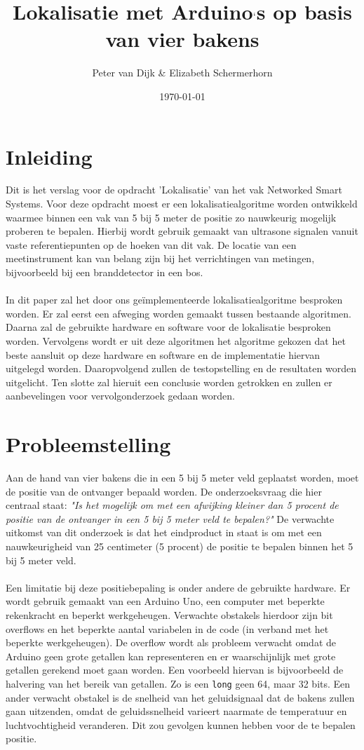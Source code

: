 \documentclass{article}
\author{Peter van Dijk \& Elizabeth Schermerhorn}
\date{\today}
\title{Lokalisatie met Arduino$`$s op basis van vier bakens}
\begin{document}
\maketitle
\newpage
\tableofcontents
\clearpage
\section{Inleiding}
Dit is het verslag voor de opdracht 'Lokalisatie' van het vak Networked Smart Systems. Voor deze opdracht moest er een lokalisatiealgoritme worden ontwikkeld waarmee binnen een vak van 5 bij 5 meter de positie zo nauwkeurig mogelijk proberen te bepalen. Hierbij wordt gebruik gemaakt van ultrasone signalen vanuit vaste referentiepunten op de hoeken van dit vak. De locatie van een meetinstrument kan van belang zijn bij het verrichtingen van metingen, bijvoorbeeld bij een branddetector in een bos. \\
\\
In dit paper zal het door ons ge\"{i}mplementeerde lokalisatiealgoritme besproken worden. Er zal eerst een afweging worden gemaakt tussen bestaande algoritmen. Daarna zal de gebruikte hardware en software voor de lokalisatie besproken worden. Vervolgens wordt er uit deze algoritmen het algoritme gekozen dat het beste aansluit op deze hardware en software en de implementatie hiervan uitgelegd worden. Daaropvolgend zullen de testopstelling en de resultaten worden uitgelicht. Ten slotte zal hieruit een conclusie worden getrokken en zullen er aanbevelingen voor vervolgonderzoek gedaan worden.


\section{Probleemstelling}
Aan de hand van vier bakens die in een 5 bij 5 meter veld geplaatst worden, moet de positie van de ontvanger bepaald worden. De onderzoeksvraag die hier centraal staat: \textit{"Is het mogelijk om met een afwijking kleiner dan 5 procent de positie van de ontvanger in een 5 bij 5 meter veld te bepalen?"}
De verwachte uitkomst van dit onderzoek is dat het eindproduct in staat is om met een nauwkeurigheid van 25 centimeter (5 procent) de positie te bepalen binnen het 5 bij 5 meter veld. \\
\\
Een limitatie bij deze positiebepaling is onder andere de gebruikte hardware. Er wordt gebruik gemaakt van een Arduino Uno, een computer met beperkte rekenkracht en beperkt werkgeheugen.\cite{uno}
Verwachte obstakels hierdoor zijn bit overflows en het beperkte aantal variabelen in de code (in verband met het beperkte werkgeheugen). De overflow wordt als probleem verwacht omdat de Arduino geen grote getallen kan representeren en er waarschijnlijk met grote getallen gerekend moet gaan worden. Een voorbeeld hiervan is bijvoorbeeld de halvering van het bereik van getallen. Zo is een \texttt{long} geen 64, maar 32 bits.\cite{long} Een ander verwacht obstakel is de snelheid van het geluidsignaal dat de bakens zullen gaan uitzenden, omdat de geluidssnelheid varieert naarmate de temperatuur en luchtvochtigheid veranderen. Dit zou gevolgen kunnen hebben voor de te bepalen positie.  
\end{document}
